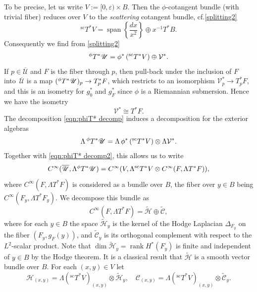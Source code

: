 \documentclass[11pt]{article}
\newcommand{\cf}{cf.\xspace}
\numberwithin{equation}{section}
\theoremstyle{plain}
\theoremstyle{definition}
\newcommand{\Umathbar}{{\overline{\mathscr{U}}}}
\newcommand\calV{{\mathcal V}}
\DeclareMathOperator\rank{rank}
\DeclareMathOperator{\Span}{span}
\newcommand{\Cinf}{C^\infty}
\newcommand{\phiT}{{}^\phi T}
\newcommand{\scT}{{}^{\mathrm{sc}}T}
\let\eps\varepsilon
\begin{document}
To be precise, let us write $V:= [0,\eps)\times B$.
Then the $\phi$-cotangent bundle (with trivial fiber) reduces over $V$ to the
\emph{scattering} cotangent bundle, \cf \eqref{splitting2}
\begin{equation}
\label{eqn:phiT* decomp2}
\scT^*V = \Span \left\{ \frac{dx}{x^2}\right\} \oplus x^{-1} T^*B.
\end{equation}
Consequently we find from \eqref{splitting2}
\begin{equation}
\label{eqn:phiT* decomp}
{}^\phi T^*\U = \phi^* \left(\scT^*V\right) \oplus \calV^*.
\end{equation}
If $p\in \overline{\mathscr{U}}$ and $F$ is the fiber through $p$, then pull-back under the inclusion of $F$ into~$\overline{\mathscr{U}}$ is a map $(\phiT^*\U)_p\to T_p^*F$, which restricts to an isomorphism $\calV^*_p\to T^*_pF$, and this is an isometry for $g_0^*$ and $g_F^*$ since $\phi$ is a Riemannian submersion. Hence we have the isometry
\begin{equation} \label{eqn:V T*F identif}
\calV^* \cong T^*F.
\end{equation}
The decomposition \eqref{eqn:phiT* decomp} induces a decomposition
for the exterior algebras
\begin{equation}
\label{eqn:Lambda decomp}
\Lambda\,\phiT^*\U =
\Lambda \,\phi^*\left(\scT^*V\right) \otimes \Lambda \calV^*.
\end{equation}
Together with \eqref{eqn:phiT* decomp2}, this allows us to write
\[
\Cinf(\Umathbar,\Lambda \phiT^*\U) = \Cinf(V, \Lambda\scT^*V \otimes \Cinf(F,\Lambda T^*F)),
\]
where $\Cinf(F,\Lambda T^*F)$ is considered as a bundle over $B$, the fiber over $y\in B$ being $\Cinf(F_y,\Lambda T^*F_y)$.
We decompose this bundle as
\begin{equation}
\label{eqn:Cinf F decomp}
\Cinf(F,\Lambda T^*F) = \widetilde{\mathscr{H}}\oplus\widetilde{\mathscr{C}},
\end{equation}
where for each $y\in B$ the space $\widetilde{\mathscr{H}}_y$ is the kernel of the Hodge Laplacian $\Delta_{F_y}$ on the fiber $(F_y,g_F(y))$, and $\widetilde{\mathscr{C}}_y$ is its orthogonal complement with respect to the $L^2$-scalar product. Note that $\dim\widetilde{\mathscr{H}}_y=\rank H^*(F_y)$ is finite and independent of $y \in B$ by the Hodge theorem.
It is a classical result \cite[Cor.\,9.11]{heatdirac} that $\widetilde{\mathscr{H}}$ is a smooth vector bundle over $B$.
For each $(x,y)\in V$ let
\[
\mathscr{H}_{(x,y)} = \Lambda(\scT^* V)_{(x,y)}\otimes\widetilde{\mathscr{H}}_y,
\quad \mathscr{C}_{(x,y)}= \Lambda(\scT^* V)_{(x,y)}\otimes\widetilde{\mathscr{C}}_y.
\]
\end{document}

